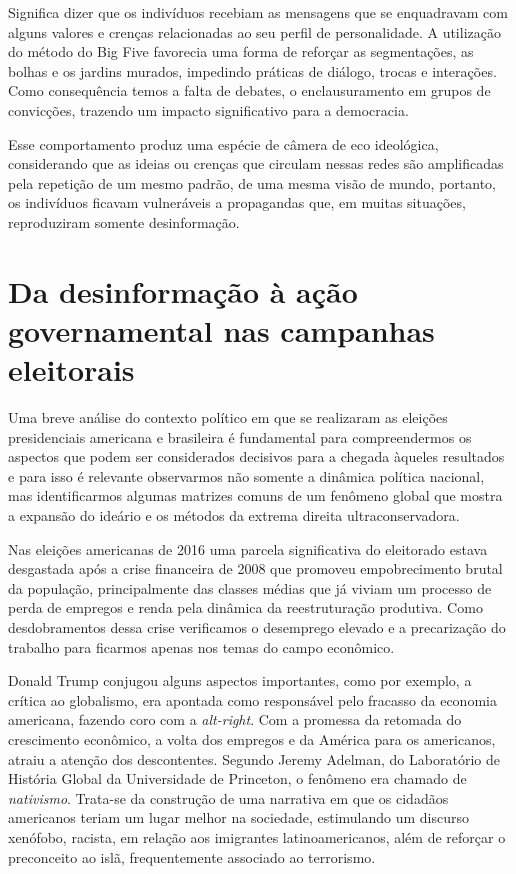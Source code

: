 Significa dizer que os indivíduos recebiam as mensagens que se
enquadravam com alguns valores e crenças relacionadas ao seu perfil de
personalidade. A utilização do método do Big Five favorecia uma forma de
reforçar as segmentações, as bolhas e os jardins murados, impedindo
práticas de diálogo, trocas e interações. Como consequência temos a
falta de debates, o enclausuramento em grupos de convicções, trazendo um
impacto significativo para a democracia.

Esse comportamento produz uma espécie de câmera de eco ideológica,
considerando que as ideias ou crenças que circulam nessas redes são
amplificadas pela repetição de um mesmo padrão, de uma mesma visão de
mundo, portanto, os indivíduos ficavam vulneráveis a propagandas que, em
muitas situações, reproduziram somente desinformação.

\section{Da desinformação à ação governamental nas campanhas eleitorais}

Uma breve análise do contexto político em que se realizaram as eleições
presidenciais americana e brasileira é fundamental para compreendermos
os aspectos que podem ser considerados decisivos para a chegada àqueles
resultados e para isso é relevante observarmos não somente a dinâmica
política nacional, mas identificarmos algumas matrizes comuns de um
fenômeno global que mostra a expansão do ideário e os métodos da extrema
direita ultraconservadora.

Nas eleições americanas de 2016 uma parcela significativa do eleitorado
estava desgastada após a crise financeira de 2008 que promoveu
empobrecimento brutal da população, principalmente das classes médias
que já viviam um processo de perda de empregos e renda pela dinâmica da
reestruturação produtiva. Como desdobramentos dessa crise verificamos o
desemprego elevado e a precarização do trabalho para ficarmos apenas nos
temas do campo econômico.

Donald Trump conjugou alguns aspectos importantes, como por exemplo, a
crítica ao globalismo, era apontada como responsável pelo fracasso da
economia americana, fazendo coro com a \textit{alt-right}. Com a promessa da
retomada do crescimento econômico, a volta dos empregos e da América
para os americanos, atraiu a atenção dos descontentes. Segundo Jeremy
Adelman, do Laboratório de História Global da Universidade de Princeton,
o fenômeno era chamado de \textit{nativismo}. Trata-se da construção de uma
narrativa em que os cidadãos americanos teriam um lugar melhor na
sociedade, estimulando um discurso xenófobo, racista, em relação aos
imigrantes latinoamericanos, além de reforçar o preconceito ao islã,
frequentemente associado ao terrorismo.


